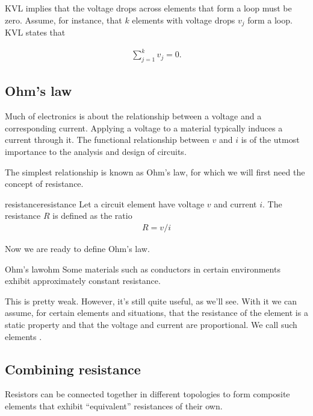 \documentclass[electronics.tex]{subfiles}
\begin{document}
KVL implies that the voltage drops across elements that form a loop must be zero.
Assume, for instance, that $k$ elements with voltage drops $v_j$ form a loop.
KVL states that

\begin{align}
  \sum_{j=1}^k v_j = 0.
\end{align}

\subsection{Ohm's law}
\tags{}

Much of electronics is about the relationship between a voltage and a corresponding current.
Applying a voltage to a material typically induces a current through it.
The functional relationship between $v$ and $i$ is of the utmost importance to the analysis and design of circuits.

The simplest relationship is known as Ohm's law, for which we will first need the concept of resistance.

\begin{Definition}{resistance}{resistance}
  Let a circuit element have voltage $v$ and current $i$. The resistance $R$ is defined as the ratio
  \begin{align}
    R = v/i
  \end{align}
\end{Definition}

Now we are ready to define Ohm's law.
\tags{}

\begin{Definition}{Ohm's law}{ohm}
  Some materials such as conductors in certain environments exhibit approximately constant resistance.
\end{Definition}

This is pretty weak.
However, it's still quite useful, as we'll see.
With it we can assume, for certain elements and situations, that the resistance of the element is a static property and that the voltage and current are proportional.
We call such elements .

\subsection{Combining resistance}

Resistors can be connected together in different topologies to form composite elements that exhibit ``equivalent'' resistances of their own.
\tags{}
\end{document}
